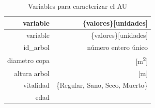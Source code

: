 \documentclass[12pt,]{book}
\begin{document}
\begin{longtable}[]{@{}rr@{}}
\caption{\label{tab:vars-AU} Variables para caracterizar el
AU}\tabularnewline
\toprule
\begin{minipage}[b]{0.09\columnwidth}\raggedleft\strut
variable\strut
\end{minipage} & \begin{minipage}[b]{0.38\columnwidth}\raggedleft\strut
\{valores\}{[}unidades{]}\strut
\end{minipage}\tabularnewline
\midrule
\endfirsthead
\toprule
\begin{minipage}[b]{0.09\columnwidth}\raggedleft\strut
variable\strut
\end{minipage} & \begin{minipage}[b]{0.38\columnwidth}\raggedleft\strut
\{valores\}{[}unidades{]}\strut
\end{minipage}\tabularnewline
\midrule
\endhead
\begin{minipage}[t]{0.09\columnwidth}\raggedleft\strut
id\_arbol\strut
\end{minipage} & \begin{minipage}[t]{0.38\columnwidth}\raggedleft\strut
número entero único\strut
\end{minipage}\tabularnewline
\begin{minipage}[t]{0.09\columnwidth}\raggedleft\strut
diametro copa\strut
\end{minipage} & \begin{minipage}[t]{0.38\columnwidth}\raggedleft\strut
{[}m\textsuperscript{2}{]}\strut
\end{minipage}\tabularnewline
\begin{minipage}[t]{0.09\columnwidth}\raggedleft\strut
altura arbol\strut
\end{minipage} & \begin{minipage}[t]{0.38\columnwidth}\raggedleft\strut
{[}m{]}\strut
\end{minipage}\tabularnewline
\begin{minipage}[t]{0.09\columnwidth}\raggedleft\strut
vitalidad\strut
\end{minipage} & \begin{minipage}[t]{0.38\columnwidth}\raggedleft\strut
\{Regular, Sano, Seco, Muerto\}\strut
\end{minipage}\tabularnewline
\begin{minipage}[t]{0.09\columnwidth}\raggedleft\strut
edad\strut
\end{minipage} & \begin{minipage}[t]{0.38\columnwidth}\raggedleft\strut

\end{minipage}
\end{longtable}
\end{document}
